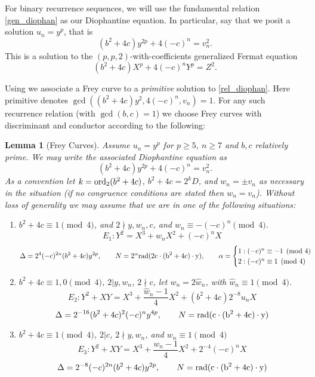 \documentclass[12pt]{amsart}
\newtheorem{lem}[thm]{Lemma}
\theoremstyle{definition}
\newcommand{\rad}{\rm rad}
\newcommand{\notdiv}{\nmid}
\newcommand{\ord}{{\rm{ord}}}
\begin{document}
For binary recurrence sequences, we will use the fundamental relation \eqref{gen_diophan} as our Diophantine equation.  In particular, say that we posit a solution $u_n = y^p$, that is
\begin{equation}\label{rel_diophan} (b^2+4c)y^{2p}+4(-c)^n = v_n^2 .\end{equation}
This is a solution to the $(p,p,2)$-with-coefficients generalized Fermat equation
\[ (b^2+4c)X^p +4(-c)^nY^p = Z^2. \]

Using \cite{bennett04} we associate a Frey curve to a \textit{primitive} solution to \eqref{rel_diophan}.  Here primitive denotes $\gcd((b^2+4c)y^2, 4(-c)^n, v_n ) = 1$.  For any such recurrence relation (with $\gcd(b,c)=1$) we choose Frey curves with discriminant and conductor according to the following:

\begin{lem}[Frey Curves]\label{freycurves}
Assume $u_n = y^p$ for $p\geq 5$, $n \geq 7$ and $b,c$ relatively prime.  We may write the associated Diophantine equation as
\[ (b^2+4c)y^{2p} + 4(-c)^n = v_n^2.\]
As a convention let $k = \ord_2(b^2+4c)$,  $b^2+4c = 2^kD$, and $w_n = \pm v_n$ as necessary in the situation (if no congruence conditions are stated then $w_n = v_n$).  Without loss of generality we may assume that we are in one of the following situations:



\begin{enumerate}[1.]

\item $b^2+4c \equiv 1 \pmod{4}$, and $2 \notdiv y,w_n,c$, and $w_n \equiv -(-c)^n \pmod{4}$.
\[ E_1: Y^2 = X^3 + w_nX^2 + (-c)^nX \]
\[ \Delta = 2^4(-c)^{2n}(b^2+4c)y^{2p},  \qquad N = 2^{\alpha} \rad(2c \cdot (b^2+4c) \cdot y), \qquad \alpha =  \begin{cases} 1: (-c)^n \equiv -1 \pmod{4}\\ 2 : (-c)^n \equiv 1 \pmod{4} \end{cases} \]

\item $b^2+4c \equiv 1,0 \pmod{4}$, $2|y,w_n$, $2 \notdiv c$, let $w_n = 2\hat{w}_n$, with $\hat{w}_n \equiv 1 \pmod{4}$.
\[ E_{2} : Y^2 +XY = X^3 + \frac{\hat{w}_n - 1}{4} X^2 + (b^2+4c)2^{-8}u_nX \]
\[ \Delta = 2^{-16}(b^2+4c)^2(-c)^ny^{4p}, \qquad N = \rad( c \cdot (b^2+4c)\cdot y)  \]

\item $b^2+4c \equiv 1 \pmod{4}$, $2|c$, $2 \notdiv y,w_n$, and $w_n \equiv 1 \pmod{4}$
\[ E_{3}: Y^2 +XY = X^3 +\frac{w_n-1}{4}X^2 +2^{-4}(-c)^nX \]
\[ \Delta = 2^{-8}(-c)^{2n}(b^2+4c)y^{2p} , \qquad N =\rad( c \cdot (b^2+4c)\cdot y)  \]


\end{enumerate}
\end{lem}
\end{document}
